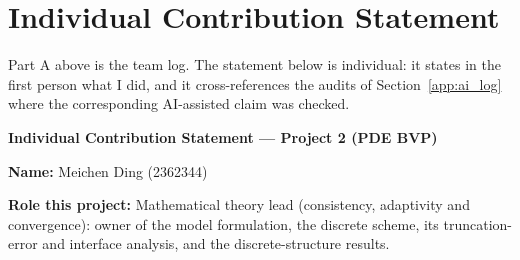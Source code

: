\section{Individual Contribution Statement}
\label{app:ics}

Part A above is the team log. The statement below is individual: it states in
the first person what I did, and it cross-references the audits of
Section~\ref{app:ai_log} where the corresponding AI-assisted claim was checked.

\begin{formbox}\small
\textbf{Individual Contribution Statement --- Project 2 (PDE BVP)}

\textbf{Name:} Meichen Ding (2362344)

\textbf{Role this project:} Mathematical theory lead (consistency, adaptivity
and convergence): owner of the model formulation, the discrete scheme, its
truncation-error and interface analysis, and the discrete-structure results.


\end{formbox}
